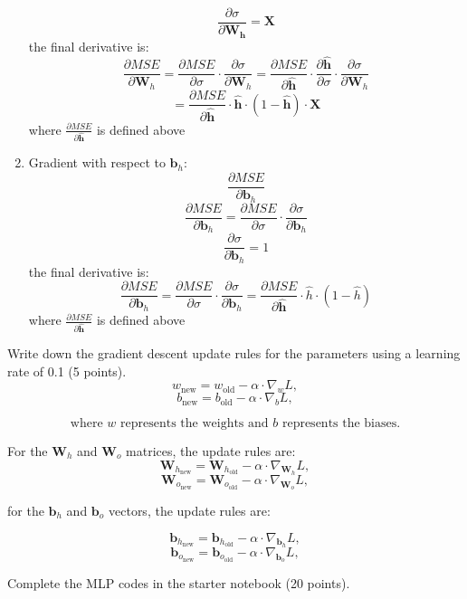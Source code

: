 \documentclass{article}
\begin{document}
\begin{enumerate}
    \[
    \frac{\partial \sigma}{\partial \mathbf{W_h}} = \mathbf{X}
    \]
    the final derivative is:
    \[
    \frac{\partial MSE}{\partial \mathbf{W}_h} = \frac{\partial MSE}{\partial \sigma} \cdot \frac{\partial \sigma}{\partial \mathbf{W}_h} = \frac{\partial MSE}{\partial \mathbf{\hat{h}}} \cdot \frac{\partial \mathbf{\hat{h}}}{\partial \sigma} \cdot \frac{\partial \sigma}{\partial \mathbf{W}_h}
    \]
    \[
    = \frac{\partial MSE}{\partial \mathbf{\hat{h}}} \cdot \mathbf{\hat{h}} \cdot (1 - \mathbf{\hat{h}}) \cdot \mathbf{X}
    \]
    where $\frac{\partial MSE}{\partial \mathbf{\hat{h}}}$ is defined above
    \item Gradient with respect to $\mathbf{b}_h$: $$\frac{\partial MSE}{\partial \mathbf{b}_h}$$
    \[
    \frac{\partial MSE}{\partial \mathbf{b}_h} = \frac{\partial MSE}{\partial \sigma} \cdot \frac{\partial \sigma}{\partial \mathbf{b}_h}
    \]
    \[
    \frac{\partial \sigma}{\partial \mathbf{b}_h} = 1 
    \]
    the final derivative is:
    \[
    \frac{\partial MSE}{\partial \mathbf{b}_h} = \frac{\partial MSE}{\partial \sigma} \cdot \frac{\partial \sigma}{\partial \mathbf{b}_h} = \frac{\partial MSE}{\partial \mathbf{\hat{h}}} \cdot \hat{h} \cdot (1 - \hat{h})
    \]
    where $\frac{\partial MSE}{\partial \mathbf{\hat{h}}}$ is defined above
\end{enumerate}

Write down the gradient descent update rules for the parameters using a learning rate of 0.1 (5 points).
\[
w_{\text{new}} = w_{\text{old}} - \alpha \cdot \nabla_w L,
\]
\[
b_{\text{new}} = b_{\text{old}} - \alpha \cdot \nabla_b L,
\]

\[
\text{where } w \text{ represents the weights and } b \text{ represents the biases.}
\]

For the $\mathbf{W}_h$ and $\mathbf{W}_o$ matrices, the update rules are:
\[
\mathbf{W}_{h_{\text{new}}} = \mathbf{W}_{h_{\text{old}}} - \alpha \cdot \nabla_{\mathbf{W}_h} L,
\]
\[
\mathbf{W}_{o_{\text{new}}} = \mathbf{W}_{o_{\text{old}}} - \alpha \cdot \nabla_{\mathbf{W}_o} L,
\]

for the $\mathbf{b}_h$ and $\mathbf{b}_o$ vectors, the update rules are:

\[
\mathbf{b}_{h_{\text{new}}} = \mathbf{b}_{h_{\text{old}}} - \alpha \cdot \nabla_{\mathbf{b}_h} L,
\]
\[
\mathbf{b}_{o_{\text{new}}} = \mathbf{b}_{o_{\text{old}}} - \alpha \cdot \nabla_{\mathbf{b}_o} L,
\]

Complete the MLP codes in the starter notebook (20 points).
\end{document}
